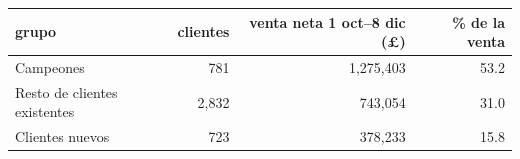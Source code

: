 \begin{tabular}{lrrr}
\toprule
grupo & clientes & venta neta 1 oct–8 dic (\pounds{}) & \% de la venta \\
\midrule
Campeones & 781 & 1,275,403 & 53.2 \\
Resto de clientes existentes & 2,832 & 743,054 & 31.0 \\
Clientes nuevos & 723 & 378,233 & 15.8 \\
\bottomrule
\end{tabular}